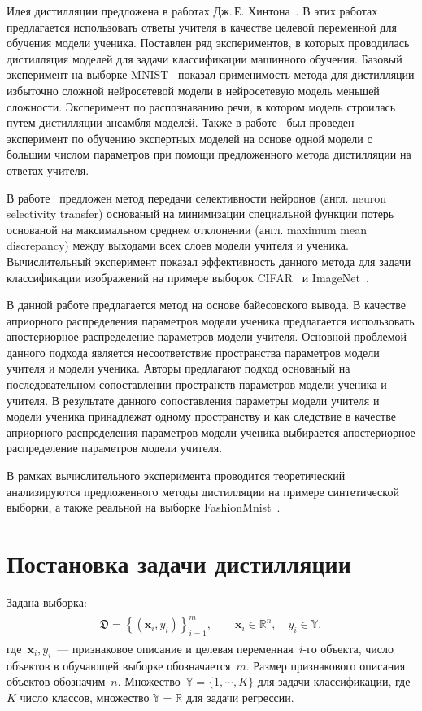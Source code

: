 \documentclass[12pt]{a&t}
\begin{document}
Идея дистилляции предложена в работах Дж.\,Е. Хинтона~\cite{Hinton2015, Vapnik2015, Lopez2016}. В этих работах предлагается использовать ответы учителя в качестве целевой переменной для обучения модели ученика. Поставлен ряд экспериментов, в которых проводилась дистилляция моделей для задачи классификации машинного обучения. Базовый эксперимент на выборке MNIST~\cite{mnist} показал применимость метода для дистилляции избыточно сложной нейросетевой модели в нейросетевую модель меньшей сложности. Эксперимент по распознаванию речи, в котором модель строилась путем дистилляции ансамбля моделей. Также в работе~\cite{Hinton2015} был проведен эксперимент по обучению экспертных моделей на основе одной модели с большим числом параметров при помощи предложенного метода дистилляции на ответах учителя.

В работе~\cite{Zehao2017} предложен метод передачи селективности нейронов (англ. neuron selectivity transfer) основаный на минимизации специальной функции потерь основаной на максимальном среднем отклонении (англ. maximum mean discrepancy) между выходами всех слоев модели учителя и ученика. Вычислительный эксперимент показал эффективность данного метода для задачи классификации изображений на примере выборок CIFAR~\cite{cifar10} и ImageNet~\cite{imagenet}.

В данной работе предлагается метод на основе байесовского вывода. В качестве априорного распределения параметров модели ученика предлагается использовать апостериорное распределение параметров модели учителя. Основной проблемой данного подхода является несоответствие пространства параметров модели учителя и модели ученика. Авторы предлагают подход основаный на последовательном сопоставлении пространств параметров модели ученика и учителя. В результате данного сопоставления параметры модели учителя и модели ученика принадлежат одному пространству и как следствие в качестве априорного распределения параметров модели ученика выбирается апостериорное распределение параметров модели учителя.

В рамках вычислительного эксперимента проводится теоретический анализируются предложенного методы дистилляции на примере синтетической выборки, а также реальной на выборке FashionMnist~\cite{fashionmnist}.

\section{Постановка задачи дистилляции}
Задана выборка:
\begin{gather}
\label{eq:st:1}
\begin{aligned}
\mathfrak{D} = \left\{\left(\mathbf{x}_i, y_i\right)\right\}_{i=1}^{m}, \qquad \mathbf{x}_i \in \mathbb{R}^{n}, \quad y_i \in \mathbb{Y},
\end{aligned}
\end{gather}
где~$\mathbf{x}_i, y_i$~--- признаковое описание и целевая переменная~$i$-го объекта, число объектов в обучающей выборке обозначается~$m$. Размер признакового описания объектов обозначим~$n$. Множество~$\mathbb{Y}=\{1,\cdots,K\}$ для задачи классификации, где~$K$ число классов, множество $\mathbb{Y}=\mathbb{R}$ для задачи регрессии.
\end{document}
